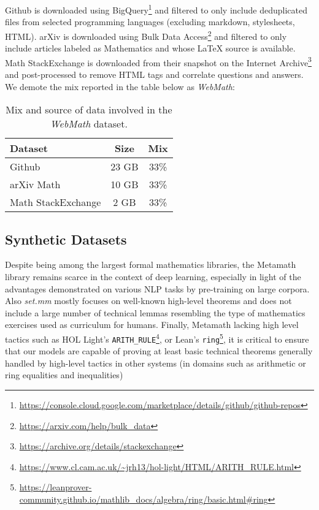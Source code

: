 \documentclass{article}
\begin{document}
Github is downloaded using BigQuery\footnote{\url{https://console.cloud.google.com/marketplace/details/github/github-repos}} and filtered to only include deduplicated files from selected programming languages (excluding markdown, stylesheets, HTML). arXiv is downloaded using Bulk Data Access\footnote{\url{https://arxiv.com/help/bulk\_data}} and filtered to only include articles labeled as Mathematics and whose LaTeX source is available. Math StackExchange is downloaded from their snapshot on the Internet Archive\footnote{\url{https://archive.org/details/stackexchange}} and post-processed to remove HTML tags and correlate questions and answers. We demote the mix reported in the table below as \textit{WebMath}:

\begin{table}[ht]
\caption{Mix and source of data involved in the \textit{WebMath} dataset.}
\centering
\begin{tabular}{ |l|c|c| }
    \hline
    Dataset & Size & Mix \\
    \hline
    Github & 23 GB & 33\% \\
    arXiv Math & 10 GB & 33\% \\
    Math StackExchange & 2 GB & 33\% \\
    \hline
\end{tabular}
\label{table:webmathmix}
\end{table}

\subsection{Synthetic Datasets}

Despite being among the largest formal mathematics libraries, the Metamath library remains scarce in the context of deep learning, especially in light of the advantages demonstrated on various NLP tasks by pre-training on large corpora. Also \textit{set.mm} mostly focuses on well-known high-level theorems and does not include a large number of technical lemmas resembling the type of mathematics exercises used as curriculum for humans. Finally, Metamath lacking high level tactics such as HOL Light's \verb|ARITH_RULE|\footnote{\url{https://www.cl.cam.ac.uk/~jrh13/hol-light/HTML/ARITH_RULE.html}}, or Lean's \verb|ring|\footnote{\url{https://leanprover-community.github.io/mathlib_docs/algebra/ring/basic.html\#ring}}, it is critical to ensure that our models are capable of proving at least basic technical theorems generally handled by high-level tactics in other systems (in domains such as arithmetic or ring equalities and inequalities)
\end{document}

